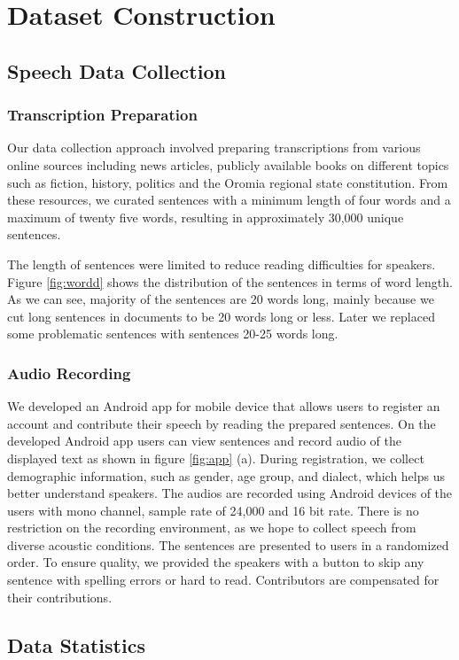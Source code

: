 \documentclass[conference, 9pt]{IEEEtran}
\begin{document}
\section{Dataset Construction}
\label{sec:data}
\subsection{Speech Data Collection}
\subsubsection{Transcription Preparation}
Our data collection approach involved preparing transcriptions from various online sources including news articles, publicly available books on different topics such as fiction, history, politics and the Oromia regional state constitution. From these resources, we curated sentences with a minimum length of four words and a maximum of twenty five words, resulting in approximately 30,000 unique sentences. 

The length of sentences were limited to reduce reading difficulties for speakers. Figure \ref{fig:wordd} shows the distribution of the sentences in terms of word length. As we can see, majority of the sentences are 20 words long, mainly because we cut long sentences in documents to be 20 words long or less. Later we replaced some problematic sentences with sentences 20-25 words long.  
\subsubsection{Audio Recording}
We developed an Android app for mobile device that allows users to register an account and contribute their speech by reading the prepared sentences. 
On the developed Android app users can view sentences and record audio of the displayed text as shown in figure \ref{fig:app} (a). During registration, we collect demographic information, such as gender, age group, and dialect, which helps us better understand speakers. The audios are recorded using Android devices of the users with mono channel, sample rate of 24,000  and 16 bit rate. There is no restriction on the recording environment, as we hope to collect speech from diverse acoustic conditions. 
The sentences are presented to users in a randomized order. To ensure quality, we provided the speakers with a button to skip any sentence with spelling errors or hard to read. Contributors are compensated for their contributions. 

\subsection{Data Statistics}
\end{document}
